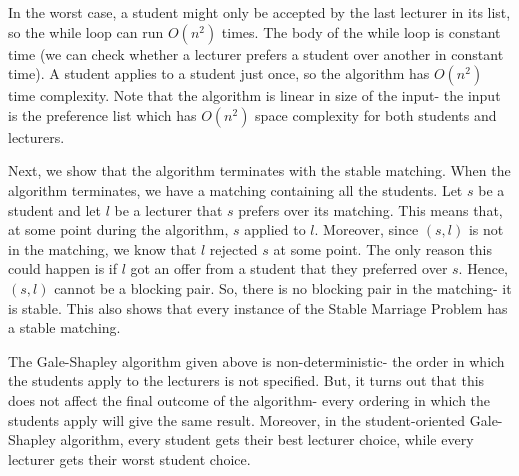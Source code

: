 \documentclass[a4paper, openany]{memoir}
\begin{document}
    In the worst case, a student might only be accepted by the last lecturer in its list, so the while loop can run $O(n^2)$ times. The body of the while loop is constant time (we can check whether a lecturer prefers a student over another in constant time). A student applies to a student just once, so the algorithm has $O(n^2)$ time complexity. Note that the algorithm is linear in size of the input- the input is the preference list which has $O(n^2)$ space complexity for both students and lecturers.

    Next, we show that the algorithm terminates with the stable matching. When the algorithm terminates, we have a matching containing all the students. Let $s$ be a student and let $l$ be a lecturer that $s$ prefers over its matching. This means that, at some point during the algorithm, $s$ applied to $l$. Moreover, since $(s, l)$ is not in the matching, we know that $l$ rejected $s$ at some point. The only reason this could happen is if $l$ got an offer from a student that they preferred over $s$. Hence, $(s, l)$ cannot be a blocking pair. So, there is no blocking pair in the matching- it is stable. This also shows that every instance of the Stable Marriage Problem has a stable matching.

    The Gale-Shapley algorithm given above is non-deterministic- the order in which the students apply to the lecturers is not specified. But, it turns out that this does not affect the final outcome of the algorithm- every ordering in which the students apply will give the same result. Moreover, in the student-oriented Gale-Shapley algorithm, every student gets their best lecturer choice, while every lecturer gets their worst student choice.
\end{document}
